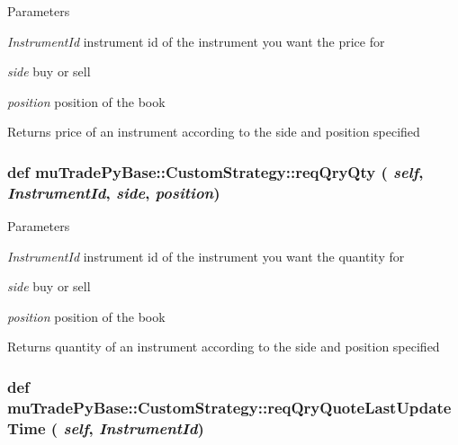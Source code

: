 \begin{DoxyParams}{Parameters}
\item[{\em InstrumentId}]instrument id of the instrument you want the price for \item[{\em side}]buy or sell \item[{\em position}]position of the book \end{DoxyParams}
\begin{DoxyReturn}{Returns}
price of an instrument according to the side and position specified 
\end{DoxyReturn}
\hypertarget{classmuTradePyBase_1_1CustomStrategy_ad6a87ecd9032561036aa40f83ed4c34f}{
\subsubsection[{reqQryQty}]{\setlength{\rightskip}{0pt plus 5cm}def muTradePyBase::CustomStrategy::reqQryQty ( {\em self}, \/   {\em InstrumentId}, \/   {\em side}, \/   {\em position})}}
\label{classmuTradePyBase_1_1CustomStrategy_ad6a87ecd9032561036aa40f83ed4c34f}

\begin{DoxyParams}{Parameters}
\item[{\em InstrumentId}]instrument id of the instrument you want the quantity for \item[{\em side}]buy or sell \item[{\em position}]position of the book \end{DoxyParams}
\begin{DoxyReturn}{Returns}
quantity of an instrument according to the side and position specified 
\end{DoxyReturn}
\hypertarget{classmuTradePyBase_1_1CustomStrategy_a7cc21237ff1f78abaa29a1c87adc8f7c}{
\subsubsection[{reqQryQuoteLastUpdateTime}]{\setlength{\rightskip}{0pt plus 5cm}def muTradePyBase::CustomStrategy::reqQryQuoteLastUpdateTime ( {\em self}, \/   {\em InstrumentId})}}
\label{classmuTradePyBase_1_1CustomStrategy_a7cc21237ff1f78abaa29a1c87adc8f7c}

